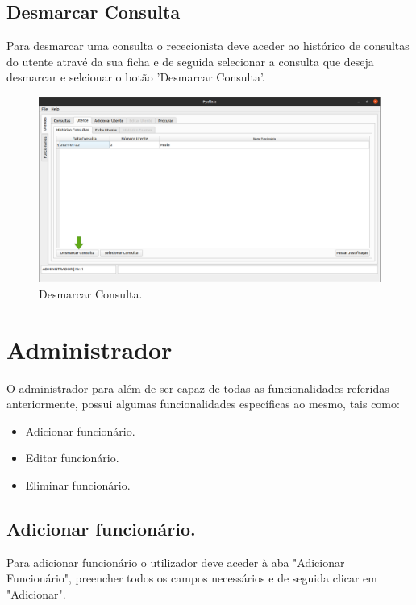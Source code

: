 \documentclass[11pt,a4paper,twoside]{article}
\begin{document}
\subsection{Desmarcar Consulta}
Para desmarcar uma consulta o rececionista deve aceder ao histórico de consultas do utente atravé da sua ficha e de seguida selecionar a consulta que deseja desmarcar e selcionar o botão 'Desmarcar Consulta'.

\begin{figure}[H]
	\centering
	\includegraphics[width=0.9\linewidth]{image/rececionista/desmarcarconsulta.png}
	\caption{Desmarcar Consulta.}
	\label{fig:desmarcarconsulta}
\end{figure}

\section{Administrador}

O administrador para além de ser capaz de todas as funcionalidades referidas anteriormente, possui algumas funcionalidades específicas ao mesmo, tais como:

\begin{itemize}
	\item Adicionar funcionário.
	\item Editar funcionário.
	\item Eliminar funcionário.
\end{itemize}

\subsection{Adicionar funcionário.}
Para adicionar funcionário o utilizador deve aceder à aba "Adicionar Funcionário", preencher todos os campos necessários e de seguida clicar em "Adicionar".
\end{document}
